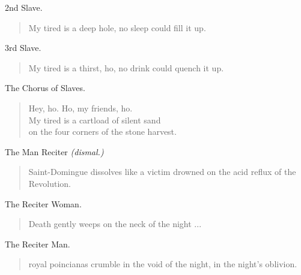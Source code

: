 \documentclass[letterpaper,article,12pt,oneside,notitlepage]{memoir}
\begin{document}
\begin{center}2nd Slave.\end{center}

\begin{verse}
\hspace{1cm} My tired is a deep hole, no sleep could fill it up. \\
\end{verse}

\begin{center}3rd Slave.\end{center}

\begin{verse}
\indent My tired is a thirst, ho, no drink could quench it up. \\
\end{verse}

\begin{center}The Chorus of Slaves.\end{center}

\begin{verse}
\hspace{1cm}  Hey, ho. Ho, my friends, ho. \\
My tired is a cartload of silent sand \\
on the four corners of the stone harvest. \\
\end{verse}

\begin{center}The Man Reciter \textit{(dismal.)}\end{center}

\begin{verse}
\indent Saint-Domingue dissolves like a victim drowned on the acid reflux of the Revolution. \\
\end{verse}

\begin{center}The Reciter Woman.\end{center}

\begin{verse}
\hspace{1cm} Death gently weeps on the neck of the night ... \\
\end{verse}

\begin{center}The Reciter Man.\end{center}

\begin{verse}
 royal poincianas crumble in the void of the night, in the night's oblivion.  \\
\end{verse}
\end{document}
